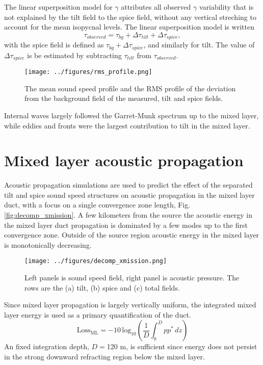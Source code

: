 \documentclass[preprint,NumberedRefs]{JASA}
\begin{document}
The linear superposition model for $\gamma$ attributes all observed $\gamma$ variability that is not explained by the tilt field to the spice field, without any vertical streching to account for the mean isopycnal levels. The linear superposition model is written
\begin{equation}
    \tau_{observed} = \tau_{bg} + \Delta \tau_{tilt} + \Delta \tau_{spice},
\end{equation}
with the spice field is defined as $\tau_{bg} + \Delta \tau_{spice}$, and similarly for tilt. The value of $\Delta \tau_{spice}$ is be estimated by subtracting $\tau_{tilt}$ from $\tau_{observed}$.

\begin{figure}
\texttt{[image: ../figures/rms\_profile.png]}
    \caption{\label{fig:c_rms}{The mean sound speed profile and the RMS profile of the deviation from the background field of the measured, tilt and spice fields. }}
\end{figure}

Internal waves largely followed the Garret-Munk spectrum up to the mixed layer, while eddies and fronts were the largest contribution to tilt in the mixed layer.

\section{\label{sec:propagation}Mixed layer acoustic propagation}
Acoustic propagation simulations are used to predict the effect of the separated tilt and spice sound speed structures on acoustic propagation in the mixed layer duct, with a focus on a single convergence zone length, Fig. \ref{fig:decomp_xmission}. A few kilometers from the source the acoustic energy in the mixed layer duct propagation is dominated by a few modes up to the first convergence zone. Outside of the source region acoustic energy in the mixed layer is monotonically decreasing.

\begin{figure}
\texttt{[image: ../figures/decomp\_xmission.png]}
    \caption{\label{fig:decomp_x}{Left panels is sound speed field, right panel is acoustic pressure. The rows are the (a) tilt, (b) spice and (c) total fields.}}
\end{figure}

Since mixed layer propagation is largely vertically uniform, the integrated mixed layer energy is used as a primary quantification of the duct.
\begin{equation}
    \textrm{Loss}_{\textrm{ML}} = -10 \, \textrm{log}_{10} \left( \frac{1}{D} \int^{D}_0 p p^* \,  dz \right)
\end{equation}
An fixed integration depth, $D=$120 m, is sufficient since energy does not persist in the strong downward refracting region below the mixed layer.
\end{document}
